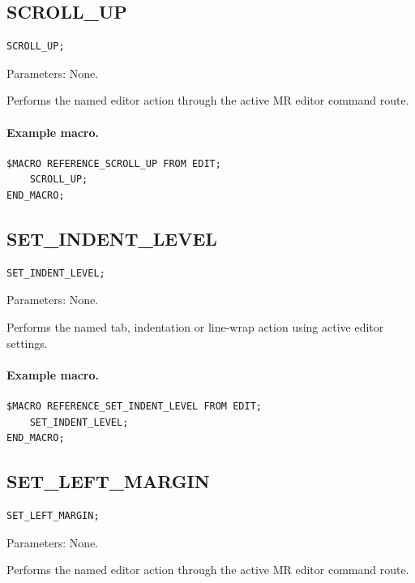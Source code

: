 \documentclass[a4paper,10pt,twoside,openany]{book}
\newenvironment{mrmacextension}{\begin{changebar}}{\end{changebar}}
\begin{document}
\label{prim:procedure-scroll-up}
\subsection*{SCROLL\_UP}
\begin{verbatim}
SCROLL_UP;
\end{verbatim}
Parameters: None.

Performs the named editor action through the active MR editor command route.

\paragraph{Example macro.}
\begin{verbatim}
$MACRO REFERENCE_SCROLL_UP FROM EDIT;
    SCROLL_UP;
END_MACRO;
\end{verbatim}

\label{prim:procedure-set-indent-level}
\subsection*{SET\_INDENT\_LEVEL}
\begin{verbatim}
SET_INDENT_LEVEL;
\end{verbatim}
Parameters: None.

Performs the named tab, indentation or line-wrap action using active editor settings.

\paragraph{Example macro.}
\begin{verbatim}
$MACRO REFERENCE_SET_INDENT_LEVEL FROM EDIT;
    SET_INDENT_LEVEL;
END_MACRO;
\end{verbatim}

\begin{mrmacextension}
\label{prim:procedure-set-left-margin}
\subsection*{SET\_LEFT\_MARGIN}
\begin{verbatim}
SET_LEFT_MARGIN;
\end{verbatim}
Parameters: None.

Performs the named editor action through the active MR editor command route.

\end{mrmacextension}
\end{document}
